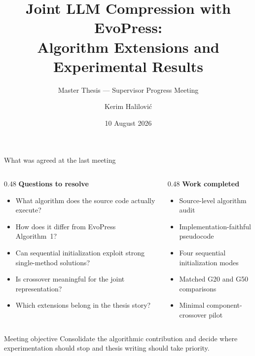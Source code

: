 \documentclass[aspectratio=169,10pt]{beamer}
\title[EvoPress Progress]{Joint LLM Compression with EvoPress:\\Algorithm Extensions and Experimental Results}
\subtitle{Master Thesis --- Supervisor Progress Meeting}
\author[Kerim Halilovi\'c]{Kerim Halilovi\'c}
\institute[TU Wien]{TU Wien, Vienna, Austria}
\date{10 August 2026}
\newcommand{\good}[1]{\textcolor{darkgreen}{\textbf{#1}}}
\newcommand{\tightitems}{\setlength{\itemsep}{0.25em}\setlength{\parskip}{0pt}}
\begin{document}
\begin{frame}
  \titlepage
\end{frame}

\begin{frame}{What was agreed at the last meeting}
\small
\begin{columns}[T,onlytextwidth]
\begin{column}{0.48\textwidth}
\textbf{Questions to resolve}
\begin{itemize}\tightitems
  \item What algorithm does the source code actually execute?
  \item How does it differ from EvoPress Algorithm~1?
  \item Can sequential initialization exploit strong single-method solutions?
  \item Is crossover meaningful for the joint representation?
  \item Which extensions belong in the thesis story?
\end{itemize}
\end{column}
\begin{column}{0.48\textwidth}
\textbf{Work completed}
\begin{itemize}\tightitems
  \item[\good{$\checkmark$}] Source-level algorithm audit
  \item[\good{$\checkmark$}] Implementation-faithful pseudocode
  \item[\good{$\checkmark$}] Four sequential initialization modes
  \item[\good{$\checkmark$}] Matched G20 and G50 comparisons
  \item[\good{$\checkmark$}] Minimal component-crossover pilot
\end{itemize}
\end{column}
\end{columns}

\vspace{0.15cm}
\begin{block}{Meeting objective}
Consolidate the algorithmic contribution and decide where experimentation should stop and thesis writing should take priority.
\end{block}
\end{frame}
\end{document}
